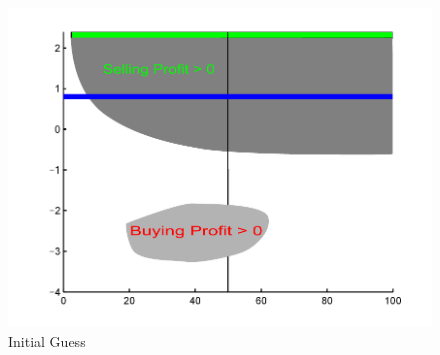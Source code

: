 \documentclass{beamer}
\begin{document}
\begin{frame}
\begin{columns}
{\begin{figure}[hbt]
  \includegraphics[scale = 0.4]{Where2Move0stepHJBViolation.pdf}
  \caption{Initial Guess}
\end{figure}}
  
  
  \end{columns}
\end{frame}
\end{document}
